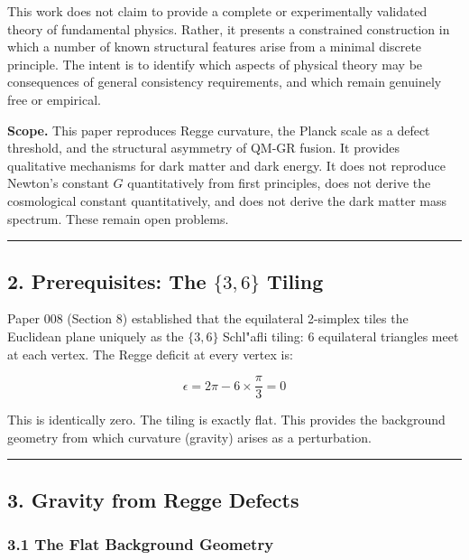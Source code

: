 \documentclass[
]{article}
\begin{document}
This work does not claim to provide a complete or experimentally
validated theory of fundamental physics. Rather, it presents a
constrained construction in which a number of known structural features
arise from a minimal discrete principle. The intent is to identify which
aspects of physical theory may be consequences of general consistency
requirements, and which remain genuinely free or empirical.

\textbf{Scope.} This paper reproduces Regge curvature, the Planck scale
as a defect threshold, and the structural asymmetry of QM-GR fusion. It
provides qualitative mechanisms for dark matter and dark energy. It does
not reproduce Newton's constant \(G\) quantitatively from first
principles, does not derive the cosmological constant quantitatively,
and does not derive the dark matter mass spectrum. These remain open
problems.

\begin{center}\rule{0.5\linewidth}{0.5pt}\end{center}

\subsection{\texorpdfstring{2. Prerequisites: The \(\{3,6\}\)
Tiling}{2. Prerequisites: The \textbackslash\{3,6\textbackslash\} Tiling}}\label{prerequisites-the-36-tiling}

Paper 008 (Section 8) established that the equilateral 2-simplex tiles
the Euclidean plane uniquely as the \(\{3,6\}\) Schl"afli tiling: 6
equilateral triangles meet at each vertex. The Regge deficit at every
vertex is:

\[\epsilon = 2\pi - 6 \times \frac{\pi}{3} = 0\]

This is identically zero. The tiling is exactly flat. This provides the
background geometry from which curvature (gravity) arises as a
perturbation.

\begin{center}\rule{0.5\linewidth}{0.5pt}\end{center}

\subsection{3. Gravity from Regge
Defects}\label{gravity-from-regge-defects}

\subsubsection{3.1 The Flat Background
Geometry}\label{the-flat-background-geometry}
\end{document}
